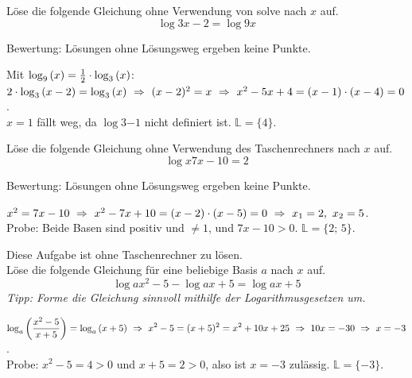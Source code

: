 \documentclass[11pt]{exam}
\begin{document}
\begin{questions}
\question[4]
Löse die folgende Gleichung ohne Verwendung von \flqq solve\frqq\: nach $x$ auf. \[\log{3}{x-2}=\log{9}{x}\]
\begin{small}
    Bewertung: Lösungen ohne Lösungsweg ergeben keine Punkte.
\end{small}
{\begin{solution}
		Mit $\log{9}{x}=\frac{1}{2}\*\log{3}{x}$: $2\*\log{3}{x-2}=\log{3}{x}\ \Rightarrow\ (x-2)^2=x\ \Rightarrow\ x^2-5x+4=(x-1)\*(x-4)=0$.\\
		$x=1$ fällt weg, da $\log{3}{-1}$ nicht definiert ist. $\mathbb{L}=\{4\}$.
\end{solution}}
{}

\question[4]
Löse die folgende Gleichung ohne Verwendung des Taschenrechners nach $x$ auf. \[\log{x}{7x-10}=2\]
\begin{small}
    Bewertung: Lösungen ohne Lösungsweg ergeben keine Punkte.
\end{small}
{\begin{solution}
		$x^2=7x-10\ \Rightarrow\ x^2-7x+10=(x-2)\*(x-5)=0\ \Rightarrow\ x_1=2,\ x_2=5$.\\
		Probe: Beide Basen sind positiv und $\neq1$, und $7x-10>0$. $\mathbb{L}=\{2;\,5\}$.
\end{solution}}
{}

 Diese Aufgabe ist ohne Taschenrechner zu lösen.\\
Löse die folgende Gleichung für eine beliebige Basis $a$ nach $x$ auf. \[\log{a}{x^2-5}-\log{a}{x+5}=\log{a}{x+5}\] {\textit{Tipp: Forme die Gleichung sinnvoll mithilfe der Logarithmusgesetzen um.}}
{\begin{solution}
		$\ds\log{a}{\frac{x^2-5}{x+5}}=\log{a}{x+5}\ \Rightarrow\ x^2-5=(x+5)^2=x^2+10x+25\ \Rightarrow\ 10x=-30\ \Rightarrow\ x=-3$.\\
		Probe: $x^2-5=4>0$ und $x+5=2>0$, also ist $x=-3$ zulässig. $\mathbb{L}=\{-3\}$.
\end{solution}}
{}



\end{questions}
\end{document}
